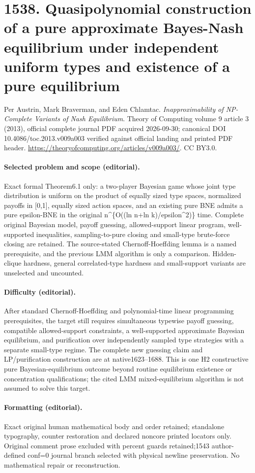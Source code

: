 \documentclass[10pt]{article}
\theoremstyle{definition}
\numberwithin{equation}{section}
\begin{document}
\section*{1538. Quasipolynomial construction of a pure approximate Bayes-Nash equilibrium under independent uniform types and existence of a pure equilibrium}
Per Austrin, Mark Braverman, and Eden Chlamtac. \emph{Inapproximability of NP-Complete Variants of Nash Equilibrium}. Theory of Computing volume 9 article 3 (2013), official complete journal PDF acquired 2026-09-30; canonical DOI 10.4086/toc.2013.v009a003 verified against official landing and printed PDF header. \url{https://theoryofcomputing.org/articles/v009a003/}. CC BY3.0.
\paragraph{Selected problem and scope (editorial).} Exact formal Theorem6.1 only: a two-player Bayesian game whose joint type distribution is uniform on the product of equally sized type spaces, normalized payoffs in [0,1], equally sized action spaces, and an existing pure BNE admits a pure epsilon-BNE in the original n\textasciicircum{}\{O((ln n+ln k)/epsilon\textasciicircum{}2)\} time. Complete original Bayesian model, payoff guessing, allowed-support linear program, well-supported inequalities, sampling-to-pure closing and small-type brute-force closing are retained. The source-stated Chernoff-Hoeffding lemma is a named prerequisite, and the previous LMM algorithm is only a comparison. Hidden-clique hardness, general correlated-type hardness and small-support variants are unselected and uncounted.
\paragraph{Difficulty (editorial).} After standard Chernoff-Hoeffding and polynomial-time linear programming prerequisites, the target still requires simultaneous typewise payoff guessing, compatible allowed-support constraints, a well-supported approximate Bayesian equilibrium, and purification over independently sampled type strategies with a separate small-type regime. The complete new guessing claim and LP/purification construction are at native1623–1688. This is one H2 constructive pure Bayesian-equilibrium outcome beyond routine equilibrium existence or concentration qualifications; the cited LMM mixed-equilibrium algorithm is not assumed to solve this target.
\paragraph{Formatting (editorial).} Exact original human mathematical body and order retained; standalone typography, counter restoration and declared noncore printed locators only. Original comment prose excluded with percent guards retained;1543 author-defined conf=0 journal branch selected with physical newline preservation. No mathematical repair or reconstruction.
\end{document}
